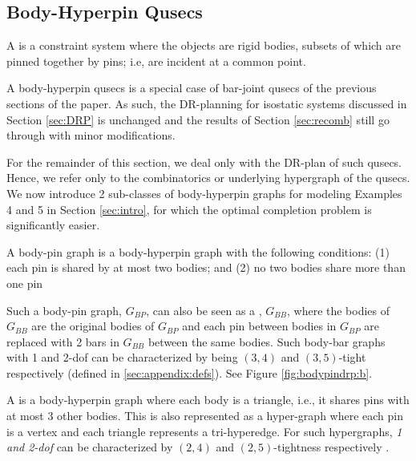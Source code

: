 \subsection{Body-Hyperpin Qusecs}


\begin{definition}
    A  is a constraint system where the objects are rigid bodies,  subsets of which are pinned together by pins; i.e, are incident at a common point.
\end{definition}

\begin{remark*}\label{rem:bodypin_is_barjoint}
    A body-hyperpin qusecs is a special case of bar-joint qusecs of the previous sections of the paper. As such, the DR-planning for isostatic systems discussed in Section \ref{sec:DRP} is unchanged and the results of Section \ref{sec:recomb} still go through with minor modifications.
\end{remark*}

For the remainder of this section, we deal only with the DR-plan of such qusecs. Hence, we refer only to the combinatorics or underlying hypergraph of the qusecs. We now introduce 2 sub-classes of body-hyperpin graphs for modeling Examples 4 and 5 in Section \ref{sec:intro}, for which the optimal completion problem is significantly easier.

\begin{definition}\label{def:body-pin}
    A body-pin graph is a body-hyperpin graph with the following conditions:
    (1) each pin is shared by at most two bodies; and
    (2) no two bodies share more than one pin

    Such a body-pin graph, $G_{BP}$, can also be seen as a , $G_{BB}$, where the bodies of $G_{BB}$ are the original bodies of $G_{BP}$ and each pin between bodies in $G_{BP}$ are replaced with 2 bars in $G_{BB}$ between the same bodies.
    Such body-bar graphs with 1 and 2-dof can be characterized by being $(3,4)$ and $(3,5)$-tight respectively \cite{Lee:2007:PGA} \cite{streinu2009sparse} (defined in \ref{sec:appendix:defs}). See Figure \ref{fig:bodypindrp:b}.
\end{definition}

\begin{definition}
    A  is a body-hyperpin graph where each body is a triangle, i.e., it shares  pins with at most 3 other bodies. This is also represented as a hyper-graph where each pin is a vertex and each triangle represents a tri-hyperedge. For such hypergraphs, {\em 1 and 2-dof} can be characterized by $(2,4)$ and $(2,5)$-tightness respectively \cite{Lee:2007:PGA} \cite{streinu2009sparse}.
\end{definition}

